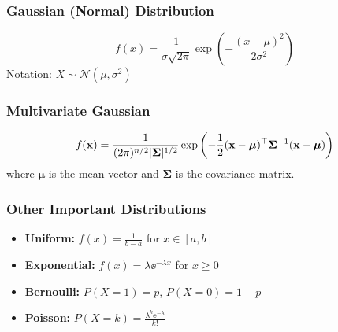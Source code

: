 

\subsubsection{Gaussian (Normal) Distribution}
\begin{equation}
f(x) = \frac{1}{\sigma\sqrt{2\pi}} \exp\left(-\frac{(x-\mu)^2}{2\sigma^2}\right)
\end{equation}
Notation: $X \sim \mathcal{N}(\mu, \sigma^2)$



\subsubsection{Multivariate Gaussian}
\begin{equation}
f(\mathbf{x}) = \frac{1}{(2\pi)^{n/2}|\boldsymbol{\Sigma}|^{1/2}} \exp\left(-\frac{1}{2}(\mathbf{x}-\boldsymbol{\mu})^\top\boldsymbol{\Sigma}^{-1}(\mathbf{x}-\boldsymbol{\mu})\right)
\end{equation}
where $\boldsymbol{\mu}$ is the mean vector and $\boldsymbol{\Sigma}$ is the covariance matrix.

\subsubsection{Other Important Distributions}
\begin{itemize}
    \item \textbf{Uniform:} $f(x) = \frac{1}{b-a}$ for $x \in [a,b]$
    \item \textbf{Exponential:} $f(x) = \lambda\ee^{-\lambda x}$ for $x \geq 0$
    \item \textbf{Bernoulli:} $P(X=1) = p$, $P(X=0) = 1-p$
    \item \textbf{Poisson:} $P(X=k) = \frac{\lambda^k \ee^{-\lambda}}{k!}$
\end{itemize}

